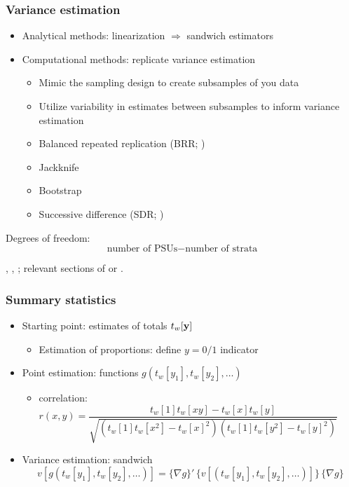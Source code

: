 \documentclass[aspectratio=43]{beamer}
\begin{document}
\begin{frame}\frametitle{Variance estimation}

\begin{itemize}
    \item Analytical methods: linearization $\Rightarrow$ sandwich estimators
    \item Computational methods: replicate variance estimation
    \begin{itemize}
        \item Mimic the sampling design to create subsamples of you data
        \item Utilize variability in estimates between subsamples to inform variance estimation
        \item Balanced repeated replication (BRR; \citet{mccarthy:1969})
        \item Jackknife \citep{krewski:rao:1981}
        \item Bootstrap \citep{rao:wu:1988,sitter:1992:3bs}
        \item Successive difference (SDR; \citet{ash:2011})
    \end{itemize}
\end{itemize}

Degrees of freedom:
$$
\mbox{number of PSUs} - \mbox{number of strata}
$$ 
 
\citet{shao:1996}, \citet{rust:rao:1996}, \citet{kolenikov:2010}; 
relevant sections of \citet{heeringa:west:berglund:2017} or \citet{lumley:2010}.

\end{frame}


\begin{frame}\frametitle{Summary statistics}

\begin{itemize}
    \item Starting point: estimates of totals $t_w[{\bf y}]$
        \begin{itemize} \item Estimation of proportions: define $y=0/1$ indicator \end{itemize}
    \item Point estimation: functions $g(t_w[y_1], t_w[y_2], \ldots)$
        \begin{itemize}
            \item correlation: $r(x,y) = \dfrac{t_w[1]t_w[xy]-t_w[x]t_w[y]}%
                {\sqrt{(t_w[1]t_w[x^2]-t_w[x]^2)(t_w[1]t_w[y^2]-t_w[y]^2)}}$
        \end{itemize}
    \item Variance estimation: sandwich
        $$
            v[g(t_w[y_1], t_w[y_2], \ldots)] = \{\nabla g\}' \, \{ v[(t_w[y_1], t_w[y_2], \ldots)] \} \, \{\nabla g \}
        $$
\end{itemize}

\end{frame}
\end{document}
